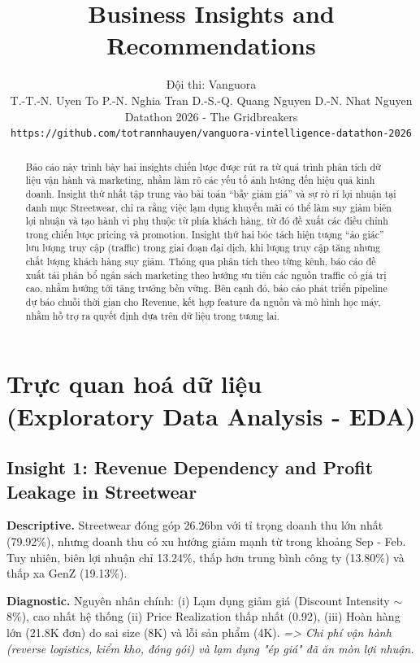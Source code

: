 \documentclass{article}
\title{Business Insights and Recommendations}
\author{
  Đội thi: Vanguora\\
  \vspace{0.3em}
  T.-T.-N. Uyen To \quad P.-N. Nghia Tran \quad D.-S.-Q. Quang Nguyen \quad D.-N. Nhat Nguyen \\
  \vspace{0.3em}
  Datathon 2026 - The Gridbreakers \\
  \texttt{https://github.com/totrannhauyen/vanguora-vintelligence-datathon-2026}
}
\begin{document}
\maketitle

\begin{abstract}
Báo cáo này trình bày hai insights chiến lược được rút ra từ quá trình phân tích dữ liệu vận hành và marketing, nhằm làm rõ các yếu tố ảnh hưởng đến hiệu quả kinh doanh. Insight thứ nhất tập trung vào bài toán ``bẫy giảm giá'' và sự rò rỉ lợi nhuận tại danh mục Streetwear, chỉ ra rằng việc lạm dụng khuyến mãi có thể làm suy giảm biên lợi nhuận và tạo hành vi phụ thuộc từ phía khách hàng, từ đó đề xuất các điều chỉnh trong chiến lược pricing và promotion. Insight thứ hai bóc tách hiện tượng ``ảo giác'' lưu lượng truy cập (traffic) trong giai đoạn đại dịch, khi lượng truy cập tăng nhưng chất lượng khách hàng suy giảm. Thông qua phân tích theo từng kênh, báo cáo đề xuất tái phân bổ ngân sách marketing theo hướng ưu tiên các nguồn traffic có giá trị cao, nhằm hướng tới tăng trưởng bền vững. Bên cạnh đó, báo cáo phát triển pipeline dự báo chuỗi thời gian cho Revenue, kết hợp feature đa nguồn và mô hình học máy, nhằm hỗ trợ ra quyết định dựa trên dữ liệu trong tương lai.
\end{abstract}


\maketitle
\raggedbottom
\section{Trực quan hoá dữ liệu (Exploratory Data Analysis - EDA)}
\subsection{Insight 1: Revenue Dependency and Profit Leakage in Streetwear}
\vspace{-1em}

\noindent
\textbf{Descriptive.} Streetwear đóng góp 26.26bn với tỉ trọng doanh thu lớn nhất (79.92\%), nhưng doanh thu có xu hướng giảm mạnh từ trong khoảng Sep - Feb. Tuy nhiên, biên lợi nhuận chỉ 13.24\%, thấp hơn trung bình công ty (13.80\%) và thấp xa GenZ (19.13\%).\par
\vspace{-0.3em}

\noindent
\textbf{Diagnostic.} Nguyên nhân chính: (i) Lạm dụng giảm giá (Discount Intensity $\sim$8\%), cao nhất hệ thống (ii) Price Realization thấp nhất (0.92), (iii) Hoàn hàng lớn (21.8K đơn) do sai size (8K) và lỗi sản phẩm (4K). \textit{=> Chi phí vận hành (reverse logistics, kiểm kho, đóng gói) và lạm dụng "ép giá" đã ăn mòn lợi nhuận.}\par
\vspace{-0.3em}
\end{document}
